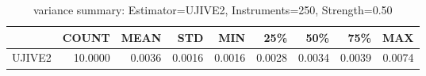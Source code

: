\begin{table}[ht]
\centering
\caption{variance summary: Estimator=UJIVE2, Instruments=250, Strength=0.50}
\begin{tabular}{lrrrrrrrr}
\toprule
 & COUNT & MEAN & STD & MIN & 25\% & 50\% & 75\% & MAX \\
\midrule
UJIVE2 & 10.0000 & 0.0036 & 0.0016 & 0.0016 & 0.0028 & 0.0034 & 0.0039 & 0.0074 \\
\bottomrule
\end{tabular}
\end{table}
